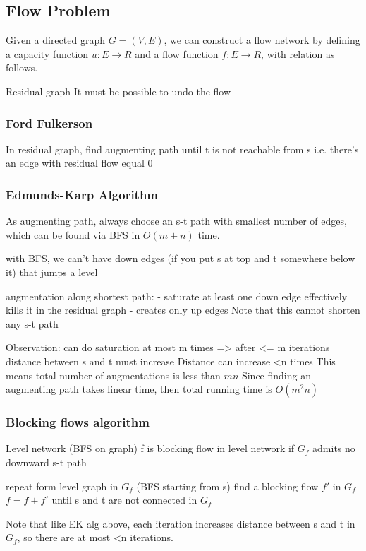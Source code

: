 \documentclass{article}
\begin{document}
\subsection{Flow Problem}
Given a directed graph $G=(V, E)$, we can construct a flow network by defining
a capacity function $u: E\rightarrow R$ and a flow function $f: E\rightarrow
R$, with relation as follows.

Residual graph
It must be possible to undo the flow

\subsubsection{Ford Fulkerson}
In residual graph, find augmenting path until t is not reachable from
s i.e. there's an edge with residual flow equal 0

\subsubsection{Edmunds-Karp Algorithm}
As augmenting path, always choose an s-t path with smallest number of edges,
which can be found via BFS in $O(m + n)$ time.

with BFS, we can't have down edges (if you put s at top and t somewhere below it) that jumps a level

augmentation along shortest path:
- saturate at least one down edge effectively kills it in the residual graph
- creates only up edges
Note that this cannot shorten any s-t path

Observation: can do saturation at most m times
=> after <= m iterations distance between s and t must increase
Distance can increase <n times
This means total number of augmentations is less than $mn$
Since finding an augmenting path takes linear time, then total running time is $O(m^2n)$

\subsubsection{Blocking flows algorithm}
Level network (BFS on graph)
f is blocking flow in level network if $G_f$ admits no downward s-t path

repeat
	form level graph in $G_f$ (BFS starting from s)
	find a blocking flow $f'$ in $G_f$
	$f = f + f'$
until s and t are not connected in $G_f$

Note that like EK alg above, each iteration increases distance between s and
t in $G_f$, so there are at most <n iterations.
\end{document}
